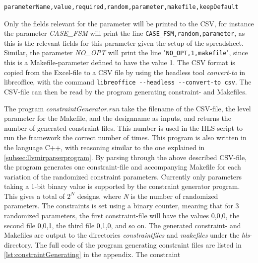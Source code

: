 \begin{verbatim}
parameterName,value,required,random,parameter,makefile,keepDefault
\end{verbatim}
Only the fields relevant for the parameter will be printed to the CSV, for instance the parameter \textit{CASE\_FSM} will print the line \verb!CASE_FSM,random,parameter!, as this is the relevant fields for this parameter given the setup of the spreadsheet. Similar, the parameter \textit{NO\_OPT} will print the line "\verb!NO_OPT,1,makefile!", since this is a Makefile-parameter defined to have the value 1. The CSV format is copied from the Excel-file to a CSV file by using the headless tool \textit{convert-to} in libreoffice, with the command \verb!libreoffice --headless --convert-to csv!. The CSV-file can then be read by the program generating constraint- and Makefiles. 

The program \textit{constraintGenerator.run} take the filename of the CSV-file, the level parameter for the Makefile, and the designname as inputs, and returns the number of generated constraint-files. This number is used in the HLS-script to run the framework the correct number of times. This program is also written in the language C++, with reasoning similar to the one explained in \cref{subsec:llvmirparserprogram}. By parsing through the above described CSV-file, the program generates one constraint-file and accompanying Makefile for each variation of the randomized constraint parameters. Currently only parameters taking a 1-bit binary value is supported by the constraint generator program. This gives a total of $2^N$ designs, where \textit{N} is the number of randomized parameters. The constraints is set using a binary counter, meaning that for 3 randomized parameters, the first constraint-file will have the values 0,0,0, the second file 0,0,1, the third file 0,1,0, and so on. The generated constraint- and Makefiles are output to the directories \textit{constraintfiles} and \textit{makefiles} under the \textit{hls}-directory. The full code of the program generating constraint files are listed in \cref{lst:constraintGenerating} in the appendix. The constraint

